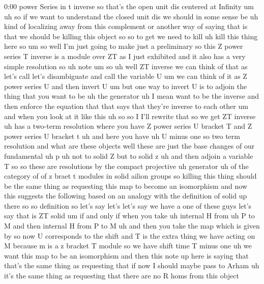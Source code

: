 \begin{unfinished}{0:00}
power  Series  in  t
inverse  so  that's  the  open  unit  dis
centered  at
Infinity
um  uh  so  if  we  want  to  understand  the
closed  unit  dis  we  should  in  some  sense
be  uh  kind  of  localizing  away  from  this
complement  or  another  way  of  saying  that
is  that  we  should  be  killing  this  object
so  so  to
get  we  need  to  kill  uh  kill  this  thing
here
so
um  so  well  I'm  just  going  to  make  just  a
preliminary  so  this  Z  power  series  T
inverse  is  a  module  over  ZT  as  I  just
exhibited  and  it  also  has  a  very  simple
resolution  so
uh  note
um  so  uh  well  ZT  inverse  we  can  think  of
that  as  let's  call  let's  disambiguate
and  call  the  variable  U  um  we  can  think
of  it  as  Z  power  series  U  and  then
invert  U  um  but  one  way  to  invert  U  is
to  adjoin  the  thing  that  you  want  to  be
uh  the  generator  uh  I  mean  want  to  be
the  inverse  and  then  enforce  the
equation  that  that  says  that  they're
inverse  to  each
other  um  and  when  you  look  at  it  like
this  uh
so  so  I  I'll  rewrite  that  so  we  get  ZT
inverse  uh  has  a  two-term  resolution
where  you  have  Z  power  series  U  bracket
T  and  Z  power  series  U  bracket
t  uh  and  here  you  have  uh  U  minus
one  so  two  term
resolution  and  what  are  these  objects
well  these  are  just  the  base  changes  of
our  fundamental  uh  p  uh  not  to  solid  Z
but  to  solid  z  uh  and  then  adjoin  a
variable  T  so  so  these  are  resolutions
by  the  compact
projective  uh
generator  uh  of  the  category  of  of  z
braet  t  modules  in  solid  ailion
groups
so  killing  this  thing  should  be  the  same
thing  as  requesting  this  map  to  become
an
isomorphism  and  now  this  suggests  the
following  based  on  an  analogy  with  the
definition  of  solid  up  there
so  so
definition  so  let's  say  let's  let's  say
we  have  a  one  of  these
guys  let's  say  that
is  ZT
solid
um  if  and  only  if  when  you  take
uh  internal  H  from  uh  P  to  M  and  then
internal  H  from  P  to
M  uh  and  then  you  take  the  map  which  is
given  by  so  now  U  corresponds  to  the
shift  and  T  is  the  extra  thing  we  have
acting  on  M  because  m  is  a  z  bracket  T
module  so  we  have  shift  time  T  minus  one
uh  we  want  this  map  to  be  an
isomorphism  and  then  this  note  up  here
is  saying  that  that's  the  same  thing  as
requesting  that  if  now  I  should  maybe
pass  to
Arham
uh
it's  the  same  thing  as  requesting  that
there  are  no  R  homs  from  this  object

\end{unfinished}
